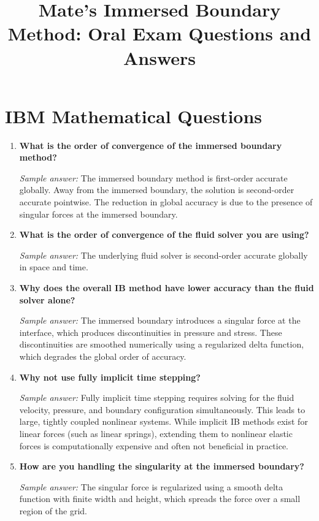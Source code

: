 \documentclass[11pt]{article}
\title{Mate's Immersed Boundary Method: Oral Exam Questions and Answers}
\author{}
\date{}
\begin{document}
\maketitle

\section*{IBM Mathematical Questions}

\begin{enumerate}[label=\arabic*.]

\item \textbf{What is the order of convergence of the immersed boundary method?}

\textit{Sample answer:}  
The immersed boundary method is first-order accurate globally. Away from the immersed boundary, the solution is second-order accurate pointwise. The reduction in global accuracy is due to the presence of singular forces at the immersed boundary.

\item \textbf{What is the order of convergence of the fluid solver you are using?}

\textit{Sample answer:}  
The underlying fluid solver is second-order accurate globally in space and time.

\item \textbf{Why does the overall IB method have lower accuracy than the fluid solver alone?}

\textit{Sample answer:}  
The immersed boundary introduces a singular force at the interface, which produces discontinuities in pressure and stress. These discontinuities are smoothed numerically using a regularized delta function, which degrades the global order of accuracy.

\item \textbf{Why not use fully implicit time stepping?}

\textit{Sample answer:}  
Fully implicit time stepping requires solving for the fluid velocity, pressure, and boundary configuration simultaneously. This leads to large, tightly coupled nonlinear systems. While implicit IB methods exist for linear forces (such as linear springs), extending them to nonlinear elastic forces is computationally expensive and often not beneficial in practice.

\item \textbf{How are you handling the singularity at the immersed boundary?}

\textit{Sample answer:}  
The singular force is regularized using a smooth delta function with finite width and height, which spreads the force over a small region of the grid.


\end{enumerate}
\end{document}

